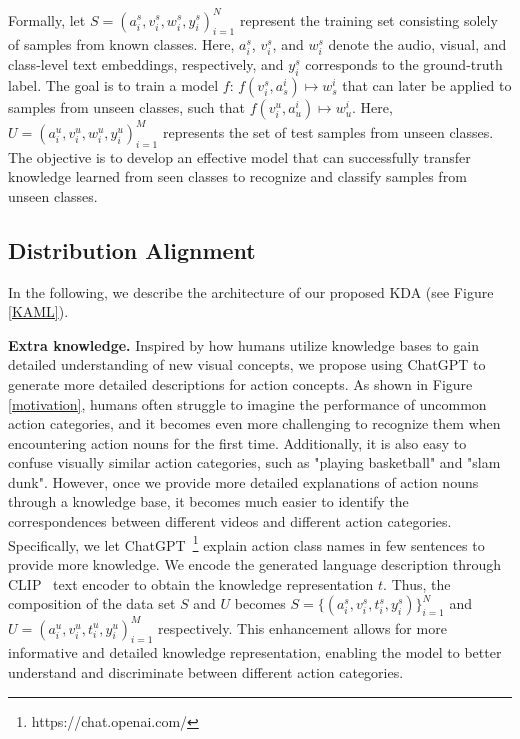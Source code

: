 \documentclass[10pt,twocolumn,letterpaper]{article}
\begin{document}
Formally, let $S={(a^s_i, v^s_i, w^s_i, y^s_i)}_{i=1}^{N}$ represent the training set consisting solely of samples from known classes. Here, $a^s_i$, $v^s_i$, and $w^s_i$ denote the audio, visual, and class-level text embeddings, respectively, and $y^s_i$ corresponds to the ground-truth label.
The goal is to train a model $f$: $f(v^s_i, a_s^i)\longmapsto w_s^i$ that can later be applied to samples from unseen classes, such that $f(v^u_i, a_u^i)\longmapsto w_u^i$. Here, $U={(a^u_i, v^u_i, w^u_i, y^u_i)}_{i=1}^{M}$ represents the set of test samples from unseen classes. The objective is to develop an effective model that can successfully transfer knowledge learned from seen classes to recognize and classify samples from unseen classes.


\subsection{Distribution Alignment}
In the following, we describe the architecture of our proposed KDA (see Figure \ref{KAML}).

\noindent
\textbf{Extra knowledge.} 
Inspired by how humans utilize knowledge bases to gain detailed understanding of new visual concepts, we propose using ChatGPT to generate more detailed descriptions for action concepts. As shown in Figure \ref{motivation}, humans often struggle to imagine the performance of uncommon action categories, and it becomes even more challenging to recognize them when encountering action nouns for the first time. Additionally, it is also easy to confuse visually similar action categories, such as "playing basketball" and "slam dunk". However, once we provide more detailed explanations of action nouns through a knowledge base, it becomes much easier to identify the correspondences between different videos and different action categories. 
Specifically, we let ChatGPT~\footnote{https://chat.openai.com/\label{gpt}} explain action class names in few sentences to provide more knowledge. We encode the generated language description through CLIP~\cite{clip} text encoder to obtain the knowledge representation $t$. Thus, the composition of the data set $S$ and $U$ becomes $S=\{(a^s_i, v^s_i, t^s_i, y^s_i)\}_{i=1}^{N}$ and $U={(a^u_i, v^u_i, t^u_i, y^u_i)}_{i=1}^{M}$ respectively. This enhancement allows for more informative and detailed knowledge representation, enabling the model to better understand and discriminate between different action categories.
\end{document}
